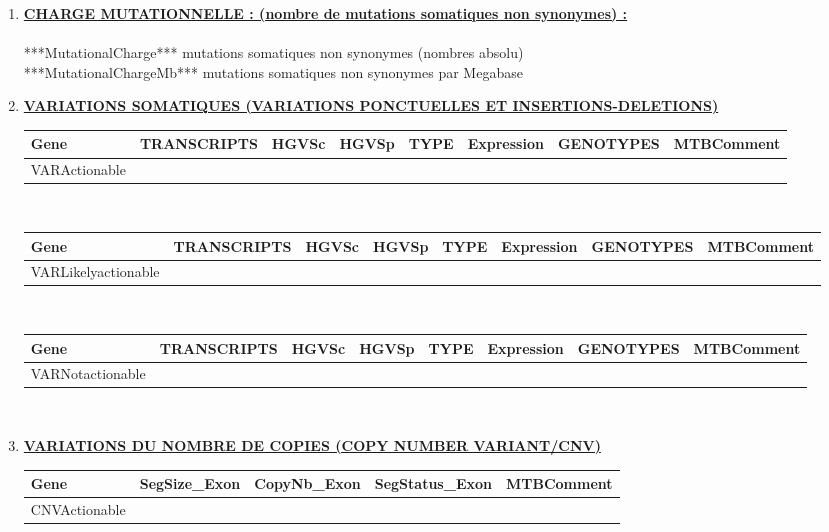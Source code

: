 \documentclass[10pt]{article}
\newcommand{\beforetitle}{\vspace*{0.75cm}}
\newcommand{\aftertitle}{\vspace*{0.4cm}}
\begin{document}
\begin{itemize}[font=\Large, label=, leftmargin=*, wide = 0pt]
\begin{enumerate}[leftmargin=*, label=\Roman*/, wide = 0pt]
\item \textbf{\underline{CHARGE MUTATIONNELLE : (nombre de mutations somatiques non synonymes) :}}
\\
\\
***MutationalCharge*** mutations somatiques non synonymes (nombres absolu)\\
***MutationalChargeMb*** mutations somatiques non synonymes par Megabase\\
\item \textbf{\underline{VARIATIONS SOMATIQUES (VARIATIONS PONCTUELLES ET INSERTIONS-DELETIONS)}}
\\
\begin{itemize} [font=\large, label=, leftmargin=*, wide = 0pt]
\begin{tabulary}{\textwidth}{|p{1.5cm}|p{2cm}|p{1.5cm}|p{1.5cm}|p{1.5cm}|p{1.5cm}|p{1.5cm}|p{4cm}|}
\hline
\scriptsize Gene &\scriptsize TRANSCRIPTS &\scriptsize HGVSc &\scriptsize HGVSp &\scriptsize TYPE &\scriptsize Expression &\scriptsize GENOTYPES &\scriptsize MTBComment\tabularnewline
\hline
VARActionable
\end{tabulary}\\

\begin{tabulary}{\textwidth}{|p{1.5cm}|p{2cm}|p{1.5cm}|p{1.5cm}|p{1.5cm}|p{1.5cm}|p{1.5cm}|p{4cm}|}
\hline
\scriptsize Gene &\scriptsize TRANSCRIPTS &\scriptsize HGVSc &\scriptsize HGVSp &\scriptsize TYPE &\scriptsize Expression &\scriptsize GENOTYPES &\scriptsize MTBComment\tabularnewline
\hline
VARLikelyactionable
\end{tabulary}\\

\begin{tabulary}{\textwidth}{|p{1.5cm}|p{2cm}|p{1.5cm}|p{1.5cm}|p{1.5cm}|p{1.5cm}|p{1.5cm}|p{4cm}|}
\hline
\scriptsize Gene &\scriptsize TRANSCRIPTS &\scriptsize HGVSc &\scriptsize HGVSp &\scriptsize TYPE &\scriptsize Expression &\scriptsize GENOTYPES &\scriptsize MTBComment\tabularnewline
\hline
VARNotactionable
\end{tabulary}
\end{itemize}
\\
\beforetitle
\item \textbf{\underline{VARIATIONS DU NOMBRE DE COPIES (COPY NUMBER VARIANT/CNV)}}
\aftertitle
\begin{itemize} [font=\large, label=, leftmargin=*, wide = 0pt]
\begin{tabulary}{\textwidth}{|p{1.5cm}|p{1.5cm}|p{1.5cm}|p{2cm}|p{9,5cm}|}
\hline
\scriptsize Gene &\scriptsize SegSize\_Exon &\scriptsize CopyNb\_Exon &\scriptsize SegStatus\_Exon &\scriptsize MTBComment\tabularnewline
\hline
CNVActionable
\end{tabulary}\\


\end{itemize}
\end{enumerate}
\end{itemize}
\end{document}
